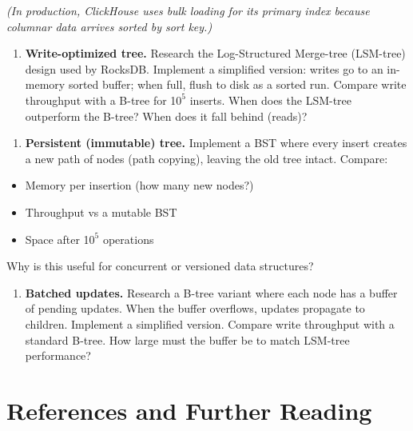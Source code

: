     \textit{(In production, ClickHouse uses bulk loading for its primary index because columnar data arrives sorted by sort key.)}

\begin{enumerate}
\item \textbf{Write-optimized tree.} Research the Log-Structured Merge-tree (LSM-tree) design used by RocksDB. Implement a simplified version: writes go to an in-memory sorted buffer; when full, flush to disk as a sorted run. Compare write throughput with a B-tree for 1$0^{5}$ inserts. When does the LSM-tree outperform the B-tree? When does it fall behind (reads)?
\end{enumerate}

\begin{enumerate}
\item \textbf{Persistent (immutable) tree.} Implement a BST where every insert creates a new path of nodes (path copying), leaving the old tree intact. Compare:
\end{enumerate}
\begin{itemize}
\item Memory per insertion (how many new nodes?)
\item Throughput vs a mutable BST
\item Space after 1$0^{5}$ operations
\end{itemize}
    Why is this useful for concurrent or versioned data structures?

\begin{enumerate}
\item \textbf{Batched updates.} Research a B-tree variant where each node has a buffer of pending updates. When the buffer overflows, updates propagate to children. Implement a simplified version. Compare write throughput with a standard B-tree. How large must the buffer be to match LSM-tree performance?
\end{enumerate}

\section{References and Further Reading}

